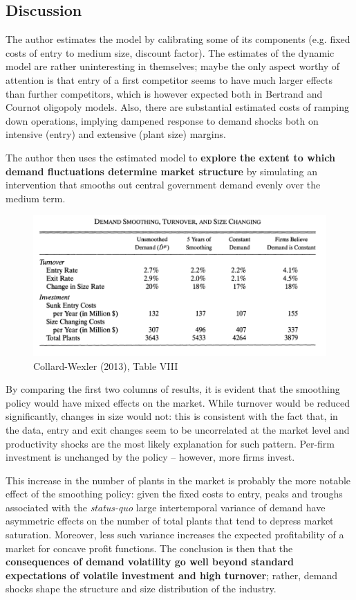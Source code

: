 \documentclass[11pt]{article}
\begin{document}
\subsection*{Discussion}

The author estimates the model by calibrating some of its components (e.g. fixed costs of entry to medium size, discount factor).
The estimates of the dynamic model are rather uninteresting in themselves; maybe the only aspect worthy of attention is that entry of a first competitor seems to have much larger effects than further competitors, which is however expected both in Bertrand and Cournot oligopoly models.
Also, there are substantial estimated costs of ramping down operations, implying dampened response to demand shocks both on intensive (entry) and extensive (plant size) margins.

The author then uses the estimated model to \textbf{explore the extent to which demand fluctuations determine market structure} by simulating an intervention that smooths out central government demand evenly over the medium term.

\begin{figure}[t!]
	\begin{center}
	\includegraphics{cw1.png}
\end{center}
	\caption{Collard-Wexler (2013), Table VIII}
	\label{cwviii}
\end{figure}

By comparing the first two columns of results, it is evident that the smoothing policy would have mixed effects on the market.
While turnover would be reduced significantly, changes in size would not: this is consistent with the fact that, in the data, entry and exit changes seem to be uncorrelated at the market level and productivity shocks are the most likely explanation for such pattern.
Per-firm investment is unchanged by the policy -- however, more firms invest.

This increase in the number of plants in the market is probably the more notable effect of the smoothing policy: given the fixed costs to entry, peaks and troughs associated with the \textit{status-quo} large intertemporal variance of demand have asymmetric effects on the number of total plants that tend to depress market saturation.
Moreover, less such variance increases the expected profitability of a market for concave profit functions.
The conclusion is then that the \textbf{consequences of demand volatility go well beyond standard expectations of volatile investment and high turnover}; rather, demand shocks shape the structure and size distribution of the industry.
\end{document}
